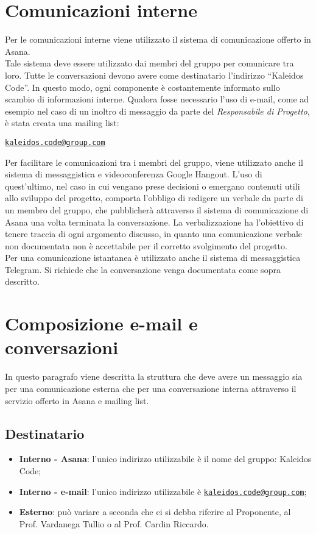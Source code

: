 \documentclass[a4paper]{report}
\newcommand{\mail}[1]{\href{mailto:#1}{\texttt{#1}}}	%
\begin{document}
	\section{Comunicazioni interne}
		Per le comunicazioni interne viene utilizzato il sistema di
		comunicazione offerto in Asana.\\
		Tale sistema deve essere utilizzato dai membri del gruppo
		per comunicare tra loro. Tutte le conversazioni devono avere
		come destinatario l'indirizzo ``Kaleidos Code''.
		In questo modo, ogni componente è costantemente informato sullo
		scambio di informazioni interne.
		Qualora fosse necessario l'uso di e-mail, come ad esempio nel caso di
		un inoltro di messaggio da parte del \textit{Responsabile di
		Progetto}, è stata creata una mailing list:
		\begin{center}
		\mail{kaleidos.code@group.com}
		\end{center}
		Per facilitare le comunicazioni tra i membri del gruppo, viene
		utilizzato anche il sistema di messaggistica e videoconferenza
		Google Hangout.
		L'uso di quest'ultimo, nel caso in cui
		vengano prese decisioni	o emergano contenuti utili allo
		sviluppo del progetto, comporta l'obbligo di redigere un verbale
		da parte di un membro del gruppo,
		che pubblicherà attraverso il sistema di comunicazione di Asana una
		volta terminata la conversazione.
		La verbalizzazione ha l'obiettivo di tenere
		traccia di ogni argomento discusso, in
		quanto una comunicazione verbale non documentata non è
		accettabile per il corretto svolgimento del progetto.\\
		Per una comunicazione istantanea è utilizzato anche il sistema
		di messaggistica Telegram. Si richiede che la conversazione
		venga documentata come sopra descritto.
	\section{Composizione e-mail e conversazioni}
		In questo paragrafo viene descritta la struttura che deve avere
		un messaggio sia per una comunicazione esterna che per una
		conversazione interna attraverso il servizio offerto in Asana e
		mailing list.
		\subsection{Destinatario}
			\begin{itemize}
			\item\textbf{Interno - Asana}: l'unico indirizzo utilizzabile è
			il nome del gruppo: Kaleidos Code;
			\item\textbf{Interno - e-mail}: l'unico indirizzo utilizzabile è
			\mail{kaleidos.code@group.com};
			\item\textbf{Esterno}: può variare a seconda che ci si debba
			riferire  al Proponente, al Prof. Vardanega Tullio o al Prof.
			Cardin Riccardo.
			\end{itemize}
\end{document}
